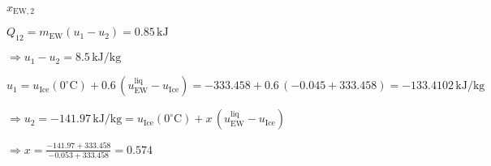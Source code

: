 \( x_{\text{EW},2} \)  

\( Q_{12} = m_{\text{EW}} (u_1 - u_2) = 0.85 \, \text{kJ} \)  

\( \Rightarrow u_1 - u_2 = 8.5 \, \text{kJ/kg} \)  

\( u_1 = u_{\text{Ice}}(0^\circ \text{C}) + 0.6 \, (u_{\text{EW}}^{\text{liq}} - u_{\text{Ice}}) = -333.458 + 0.6 \, (-0.045 + 333.458) = -133.4102 \, \text{kJ/kg} \)  

\( \Rightarrow u_2 = -141.97 \, \text{kJ/kg} = u_{\text{Ice}}(0^\circ \text{C}) + x \, (u_{\text{EW}}^{\text{liq}} - u_{\text{Ice}}) \)  

\( \Rightarrow x = \frac{-141.97 + 333.458}{-0.053 + 333.458} = 0.574 \)